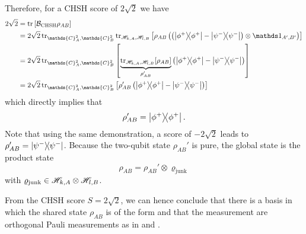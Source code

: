 Therefore, for a CHSH score of $2\sqrt{2}$ we have
\begin{equation}
	\begin{split}
		2\sqrt{2} &= \trr{\mathcal{B}_\text{CHSH} \rho_{AB}} \\
				  &= 2\sqrt{2}\tr_{\mathds{C}^2_A,\mathds{C}^2_B}\tr_{\Hil_{k,A},\Hil_{l,B}}\left[ \rho_{AB}\left(\left(\ketbra{\phi^+}-\ketbra{\psi^-}\right) \otimes \id_{A',B'}\right) \right] \\
				  &= 2\sqrt{2} \tr_{\mathds{C}^2_A,\mathds{C}^2_B} \left[ \underbrace{\tr_{\Hil_{k,A},\Hil_{l,B}}[\rho_{AB}]}_{\rho_{AB}'} \left(\ketbra{\phi^+}-\ketbra{\psi^-}\right)\right] \\
				  &= 2\sqrt{2} \tr_{\mathds{C}^2_A,\mathds{C}^2_B} \left[ \rho_{AB}'\left(\ketbra{\phi^+}-\ketbra{\psi^-}\right) \right]
	\end{split}
\end{equation}
which directly implies that 
\begin{equation}
	\rho_{AB}' = \ketbra{\phi^+}.	
\end{equation}
Note that using the same demonstration, a score of $-2\sqrt{2}$ leads to $\rho_{AB}'=\ketbra{\psi^-}$.
Because the two-qubit state $\rho_{AB}'$ is pure, the global state is the product state
\begin{equation}
	\rho_{AB} = \rho_{AB}' \otimes \varrho_\text{junk}
	\label{eq:extracted_state}
\end{equation}
with $\varrho_\text{junk}\in\mathscr{H}_{k,A}\otimes\mathscr{H}_{l,B}$.

From the CHSH score $S=2\sqrt{2}$, we can hence conclude that there is a basis in which the shared state $\rho_{AB}$ is of the form  and that the measurement are orthogonal Pauli measurements as in  and .

\medbreak

